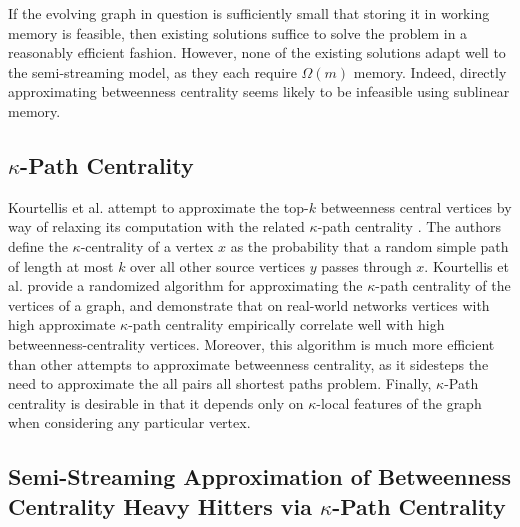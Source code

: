 \documentclass{report}
\begin{document}
If the evolving graph in question is sufficiently small that storing it in working memory is feasible, then existing solutions suffice to solve the problem in a reasonably efficient fashion. 
However, none of the existing solutions adapt well to the semi-streaming model, as they each require $\Omega(m)$ memory. 
Indeed, directly approximating betweenness centrality seems likely to be infeasible using sublinear memory.


\subsection{$\kappa$-Path Centrality} \label{sec:kpc}

Kourtellis et al. attempt to approximate the top-$k$ betweenness central vertices by way of relaxing its computation with the related $\kappa$-path centrality \cite{kourtellis2013identifying}.
The authors define the $\kappa$-centrality of a vertex $x$ as the probability that a random simple path of length at most $k$ over all other source vertices $y$ passes through $x$. 
Kourtellis et al. provide a randomized algorithm for approximating the $\kappa$-path centrality of the vertices of a graph, and demonstrate that on real-world networks vertices with high approximate $\kappa$-path centrality empirically correlate well with high betweenness-centrality vertices. 
Moreover, this algorithm is much more efficient than other attempts to approximate betweenness centrality, as it sidesteps the need to approximate the all pairs all shortest paths problem.
Finally, $\kappa$-Path centrality is desirable in that it depends only on $\kappa$-local features of the graph when considering any particular vertex.


\subsection{Semi-Streaming Approximation of Betweenness Centrality Heavy Hitters via $\kappa$-Path Centrality} \label{sec:sskpc}
\end{document}

